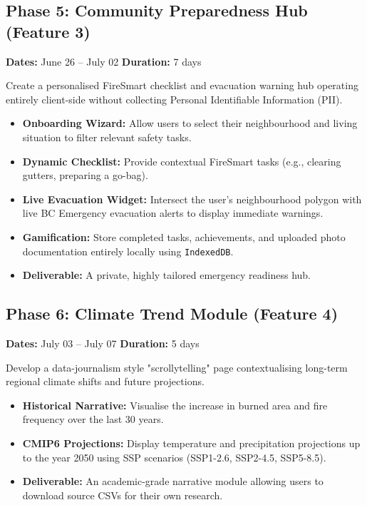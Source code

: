 \documentclass[12pt,letterpaper]{article}
\begin{document}
\subsection*{Phase 5: Community Preparedness Hub (Feature 3)}
\textbf{Dates:} June 26 -- July 02 \hfill \textbf{Duration:} 7 days

\begin{goalbox}
Create a personalised FireSmart checklist and evacuation warning hub operating entirely client-side without collecting Personal Identifiable Information (PII).
\end{goalbox}

\begin{itemize}
    \item \textbf{Onboarding Wizard:} Allow users to select their neighbourhood and living situation to filter relevant safety tasks.
    \item \textbf{Dynamic Checklist:} Provide contextual FireSmart tasks (e.g., clearing gutters, preparing a go-bag).
    \item \textbf{Live Evacuation Widget:} Intersect the user's neighbourhood polygon with live BC Emergency evacuation alerts to display immediate warnings.
    \item \textbf{Gamification:} Store completed tasks, achievements, and uploaded photo documentation entirely locally using \texttt{IndexedDB}.
    \item \textbf{Deliverable:} A private, highly tailored emergency readiness hub.
\end{itemize}

\subsection*{Phase 6: Climate Trend Module (Feature 4)}
\textbf{Dates:} July 03 -- July 07 \hfill \textbf{Duration:} 5 days

\begin{goalbox}
Develop a data-journalism style "scrollytelling" page contextualising long-term regional climate shifts and future projections.
\end{goalbox}

\begin{itemize}
    \item \textbf{Historical Narrative:} Visualise the increase in burned area and fire frequency over the last 30 years.
    \item \textbf{CMIP6 Projections:} Display temperature and precipitation projections up to the year 2050 using SSP scenarios (SSP1-2.6, SSP2-4.5, SSP5-8.5).
    \item \textbf{Deliverable:} An academic-grade narrative module allowing users to download source CSVs for their own research.
\end{itemize}
\end{document}
